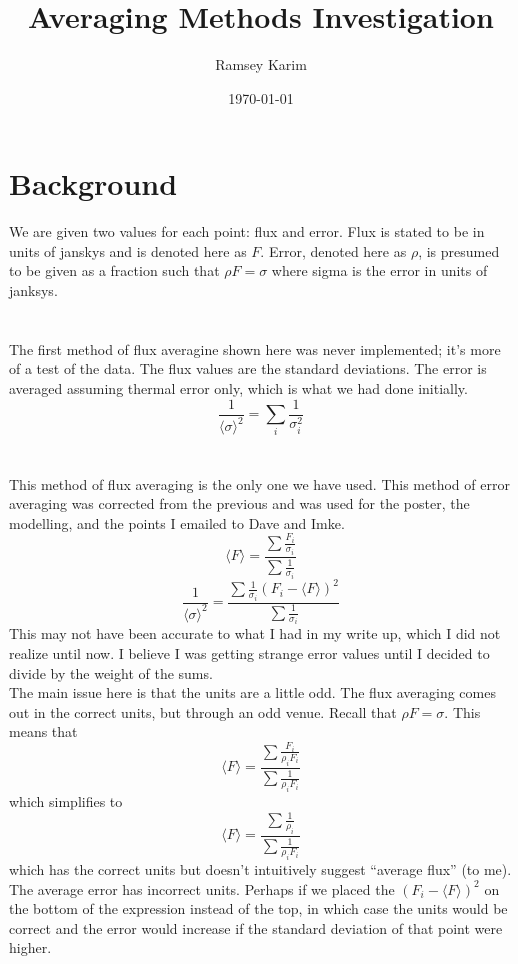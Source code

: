 \documentclass{article}
\title{Averaging Methods Investigation}
\author{Ramsey Karim}
\date{\today}
\newcommand{\av}[1]{\langle #1 \rangle}
\begin{document}
\maketitle

\section*{Background}
We are given two values for each point: flux and error.
Flux is stated to be in units of janskys and is denoted here as $F$.
Error, denoted here as $\rho$, is presumed to be given as a fraction such that
$\rho F = \sigma$ where sigma is the error in units of janksys.

\section{} \label{s:1}
The first method of flux averagine shown here was never implemented;
it's more of a test of the data.
The flux values are the standard deviations.
The error is averaged assuming thermal error only, which is what we had done initially.
$$ \frac{1}{\av{\sigma}^{2}} = \sum_{i} \frac{1}{\sigma_{i}^{2}} $$

\section{} \label{s:2}
This method of flux averaging is the only one we have used.
This method of error averaging was corrected from the previous and was used
for the poster, the modelling, and the points I emailed to Dave and Imke.
$$ \av{F} = \frac{\sum \frac{F_{i}}{\sigma_{i}}}{\sum \frac{1}{\sigma_{i}}} $$
$$ \frac{1}{\av{\sigma}^{2}} =  \frac{\sum \frac{1}{\sigma_{i}} (F_{i} - \av{F})^{2} }{\sum \frac{1}{\sigma_{i}}} $$
This may not have been accurate to what I had in my write up, which I did not realize until now.
I believe I was getting strange error values until I decided to divide by the weight of the sums. \\
The main issue here is that the units are a little odd.
The flux averaging comes out in the correct units, but through an odd venue.
Recall that $\rho F = \sigma$.
This means that
$$ \av{F} = \frac{\sum \frac{F_{i}}{\rho_{i} F_{i}}}{\sum \frac{1}{\rho_{i} F_{i}}} $$
which simplifies to
$$ \av{F} = \frac{\sum \frac{1}{\rho_{i}}}{\sum \frac{1}{\rho_{i} F_{i}}} $$
which has the correct units but doesn't intuitively suggest ``average flux''
(to me). \\
The average error has incorrect units.
Perhaps if we placed the $(F_{i} - \av{F})^{2}$ on the bottom of the expression instead of the top,
in which case the units would be correct and the error would increase if the standard deviation of
that point were higher.
\end{document}

